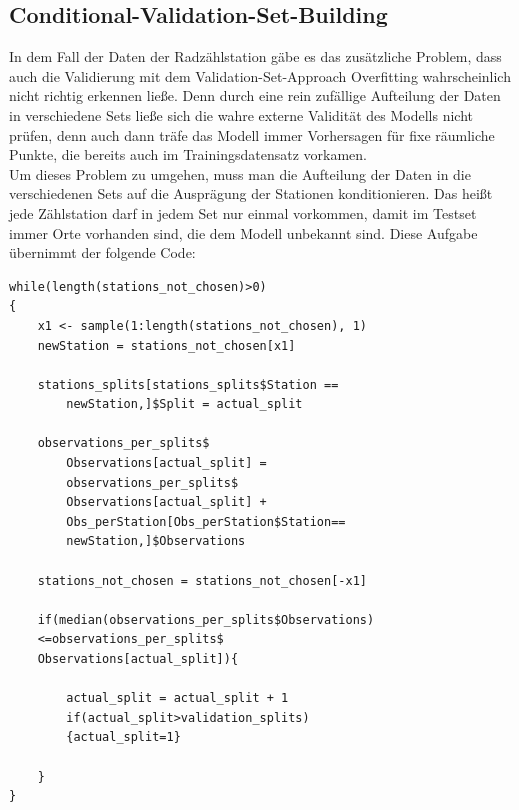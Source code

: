 \documentclass[a4paper,12pt]{thesis}
\begin{document}
\subsection{Conditional-Validation-Set-Building}

In dem Fall der Daten der Radzählstation gäbe es das zusätzliche Problem, dass auch die Validierung mit dem Validation-Set-Approach Overfitting wahrscheinlich nicht richtig erkennen ließe. Denn durch eine rein zufällige Aufteilung der Daten in verschiedene Sets ließe sich die wahre externe Validität des Modells nicht prüfen, denn auch dann träfe das Modell immer Vorhersagen für fixe räumliche Punkte, die bereits auch im Trainingsdatensatz vorkamen.\\
Um dieses Problem zu umgehen, muss man die Aufteilung der Daten in die verschiedenen Sets auf die Ausprägung der Stationen konditionieren. Das heißt jede Zählstation darf in jedem Set nur einmal vorkommen, damit im Testset immer Orte vorhanden sind, die dem Modell unbekannt sind. Diese Aufgabe übernimmt der folgende Code:


\begin{lstlisting}[caption={Aufteilung der Zählstationen},label=code:valSetBui]
while(length(stations_not_chosen)>0)
{
	x1 <- sample(1:length(stations_not_chosen), 1)
	newStation = stations_not_chosen[x1]
	
	stations_splits[stations_splits$Station == 
		newStation,]$Split = actual_split
	
	observations_per_splits$
		Observations[actual_split] = 				
		observations_per_splits$
		Observations[actual_split] + 
		Obs_perStation[Obs_perStation$Station== 
		newStation,]$Observations
	
	stations_not_chosen = stations_not_chosen[-x1]
	
	if(median(observations_per_splits$Observations)
	<=observations_per_splits$
	Observations[actual_split]){
		
		actual_split = actual_split + 1
		if(actual_split>validation_splits)
		{actual_split=1}
		
	}
}
\end{lstlisting}
\end{document}
